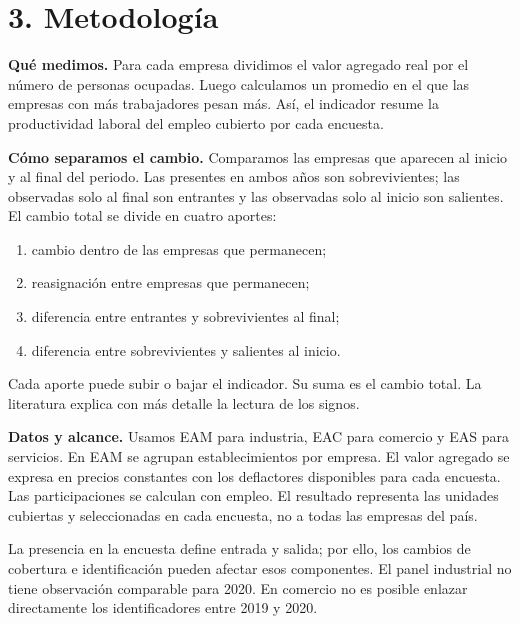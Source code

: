 \section{3. Metodología}
\textbf{Qué medimos.} Para cada empresa dividimos el valor agregado real por el número de personas ocupadas. Luego calculamos un promedio en el que las empresas con más trabajadores pesan más. Así, el indicador resume la productividad laboral del empleo cubierto por cada encuesta.

\textbf{Cómo separamos el cambio.} Comparamos las empresas que aparecen al inicio y al final del periodo. Las presentes en ambos años son sobrevivientes; las observadas solo al final son entrantes y las observadas solo al inicio son salientes. El cambio total se divide en cuatro aportes:
\begin{enumerate}[leftmargin=*,itemsep=2pt]
\item cambio dentro de las empresas que permanecen;
\item reasignación entre empresas que permanecen;
\item diferencia entre entrantes y sobrevivientes al final;
\item diferencia entre sobrevivientes y salientes al inicio.
\end{enumerate}
Cada aporte puede subir o bajar el indicador. Su suma es el cambio total. La literatura explica con más detalle la lectura de los signos.

\textbf{Datos y alcance.} Usamos EAM para industria, EAC para comercio y EAS para servicios. En EAM se agrupan establecimientos por empresa. El valor agregado se expresa en precios constantes con los deflactores disponibles para cada encuesta. Las participaciones se calculan con empleo. El resultado representa las unidades cubiertas y seleccionadas en cada encuesta, no a todas las empresas del país.

La presencia en la encuesta define entrada y salida; por ello, los cambios de cobertura e identificación pueden afectar esos componentes. El panel industrial no tiene observación comparable para 2020. En comercio no es posible enlazar directamente los identificadores entre 2019 y 2020.
\clearpage
